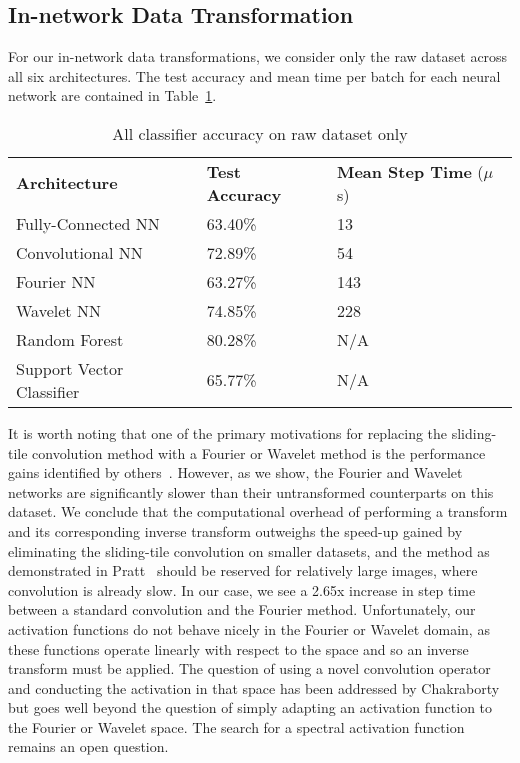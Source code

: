 \subsection{In-network Data Transformation}
For our in-network data transformations, we consider only the raw dataset across all six architectures.
The test accuracy and mean time per batch for each neural network are contained in Table~\ref{Tab:test_arch}.

\begin{table}[h]
\begin{tabular}{l|ll}
\textbf{Architecture}  & \textbf{Test Accuracy} & \textbf{Mean Step Time} ($\mu$s) \\\cline{1-3}
Fully-Connected NN            & 63.40\%         & 13\\
Convolutional NN              & 72.89\%         & 54\\  
Fourier NN                    & 63.27\%         & 143\\
Wavelet NN                    & 74.85\%         & 228\\
Random Forest                 & 80.28\%         & N/A\\ 
Support Vector Classifier     & 65.77\%         & N/A       
\end{tabular}
\caption{All classifier accuracy on raw dataset only}
\label{Tab:test_arch}	
\centering
\end{table}

It is worth noting that one of the primary motivations for replacing the sliding-tile convolution method with a Fourier or Wavelet method is the performance gains identified by others~\cite{pratt2017fcnn}.
However, as we show, the Fourier and Wavelet networks are significantly slower than their untransformed counterparts on this dataset.
We conclude that the computational overhead of performing a transform and its corresponding inverse transform outweighs the speed-up gained by eliminating the sliding-tile convolution on smaller datasets, and the method as demonstrated in Pratt~\cite{pratt2017fcnn} should be reserved for relatively large images, where convolution is already slow.
In our case, we see a 2.65x increase in step time between a standard convolution and the Fourier method. 
Unfortunately, our activation functions do not behave nicely in the Fourier or Wavelet domain, as these functions operate linearly with respect to the space and so an inverse transform must be applied. 
The question of using a novel convolution operator and conducting the activation in that space has been addressed by Chakraborty~\cite{chakraborty2019surreal} but goes well beyond the question of simply adapting an activation function to the Fourier or Wavelet space.
The search for a spectral activation function remains an open question.


